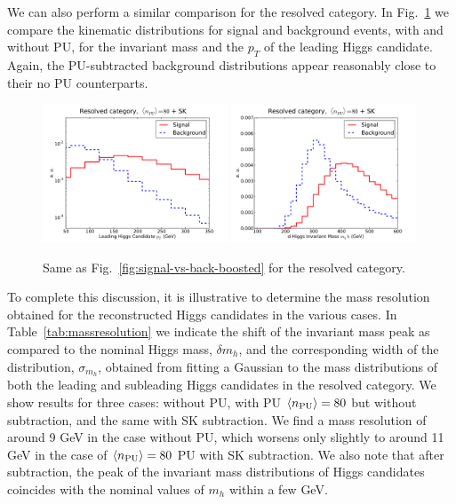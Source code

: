 We can also perform a similar comparison for
the resolved category.
%
In Fig.~\ref{fig:signal-vs-back-resolved} we compare
the kinematic distributions for signal and background events,
     with and without PU, for the invariant mass and the $p_T$ of the leading
     Higgs candidate.
Again, the PU-subtracted background distributions appear reasonably close
     to their no PU counterparts.

\begin{figure}[t]
  \begin{center}
      \includegraphics[width=0.49\textwidth]{plots/pt_h0_res_comp_back.pdf}
   \includegraphics[width=0.49\textwidth]{plots/m_h0_res_comp_back.pdf}
     \caption{\small
       Same as Fig.~\ref{fig:signal-vs-back-boosted} for the resolved category.
}
\label{fig:signal-vs-back-resolved}
\end{center}
\end{figure}

To complete this discussion, it is illustrative to determine
the mass resolution obtained for the
reconstructed Higgs candidates in the various cases.
%
In Table~\ref{tab:massresolution}
we indicate the shift of the invariant mass peak as compared
to the nominal Higgs mass, $\delta m_h$, %
and the corresponding width of the distribution, $\sigma_{m_h}$,
obtained from fitting a Gaussian to the mass distributions
of both the leading and subleading Higgs candidates in
the resolved category.
        We show results for three cases: without PU, with PU $\left\langle n_{\rm PU}\right\rangle=80$
        but without subtraction, and the same with SK subtraction.
%
        We find a mass resolution of around 9 GeV in the case
        without PU, which worsens only slightly
        to around 11 GeV in the case of $\left\langle n_{\rm PU}\right\rangle=80$ PU
        with SK subtraction.
        We also note that after subtraction, the peak of
        the invariant mass distributions of Higgs candidates
        coincides with the nominal values of $m_h$ within a few GeV.

